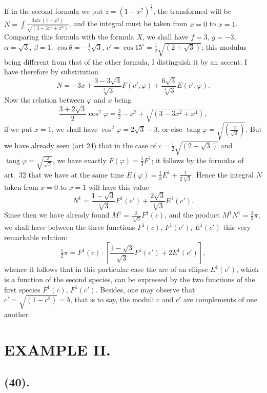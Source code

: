 \documentclass{article}
\begin{document}

If in the second formula we put $z=(1-x^{2})^{\frac{3}{2}}$, the transformed will be $N=\displaystyle\int\frac{3\,dx\,(1-x^{2})}{\sqrt{(3-3x^{2}+x^{4})}}$, and the integral must be taken from $x=0$ to $x=1$. Comparing this formula with the formula $X$, we shall have $f=3$, $g=-3$, $\alpha=\sqrt{3}$, $\beta=1$, $\cos\theta=-\frac{1}{2}\sqrt{3}$, $c'=\cos 15^{\circ}=\frac{1}{2}\sqrt{(2+\sqrt{3})}$; this modulus being different from that of the other formula, I distinguish it by an accent; I have therefore by substitution
\[ N=-3x+\frac{3-3\sqrt{3}}{\sqrt[4]{3}}F(c',\varphi)+\frac{6\sqrt{3}}{\sqrt[4]{3}}E(c',\varphi). \]
Now the relation between $\varphi$ and $x$ being
\[ \frac{3+2\sqrt{3}}{2}\cos^{2}\varphi=\tfrac{3}{2}-x^{2}+\sqrt{(3-3x^{2}+x^{4})}, \]
if we put $x=1$, we shall have $\cos^{2}\varphi=2\sqrt{3}-3$, or else $\operatorname{tang}\varphi=\sqrt{\left(\frac{2}{\sqrt{3}}\right)}$. But we have already seen (art 24) that in the case of $c=\frac{1}{2}\sqrt{(2+\sqrt{3})}$ and $\operatorname{tang}\varphi=\sqrt{\frac{2}{\sqrt{3}}}$, we have exactly $F(\varphi)=\frac{1}{3}F^{1}$; it follows by the formulas of art.~32 that we have at the same time $E(\varphi)=\frac{1}{3}E^{1}+\frac{1}{2\sqrt[4]{3}}$. Hence the integral $N$ taken from $x=0$ to $x=1$ will have this value
\[ N^{1}=\frac{1-\sqrt{3}}{\sqrt[4]{3}}F^{1}(c')+\frac{2\sqrt{3}}{\sqrt[4]{3}}E^{1}(c'). \]
Since then we have already found $M^{1}=\frac{3}{\sqrt[4]{3}}F^{1}(c)$, and the product $M^{1}N^{1}=\frac{3}{2}\pi$, we shall have between the three functions $F^{1}(c)$, $F^{1}(c')$, $E^{1}(c')$ this very remarkable relation:
\[ \tfrac{1}{2}\pi=F^{1}(c)\cdot\left[\frac{1-\sqrt{3}}{\sqrt{3}}F^{1}(c')+2E^{1}(c')\right], \]
whence it follows that in this particular case the arc of an ellipse $E^{1}(c')$, which is a function of the second species, can be expressed by the two functions of the first species $F^{1}(c)$, $F^{1}(c')$. Besides, one may observe that $c'=\sqrt{(1-c^{2})}=b$, that is to say, the moduli $c$ and $c'$ are complements of one another.


\section*{EXAMPLE II.}

\subsection*{(40).}
\end{document}
